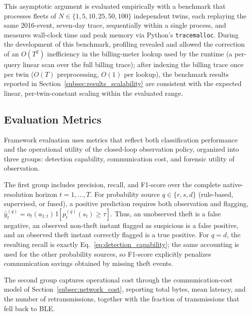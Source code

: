 \documentclass{ieeeaccess}
\begin{document}
This asymptotic argument is evaluated empirically with a benchmark that processes fleets of $N \in \{1, 5, 10, 25, 50, 100\}$ independent twins, each replaying the same 2016-event, seven-day trace, sequentially within a single process, and measures wall-clock time and peak memory via Python's \texttt{tracemalloc}. During the development of this benchmark, profiling revealed and allowed the correction of an $O(T^2)$ inefficiency in the billing-meter lookup used by the runtime (a per-query linear scan over the full billing trace); after indexing the billing trace once per twin ($O(T)$ preprocessing, $O(1)$ per lookup), the benchmark results reported in Section~\ref{subsec:results_scalability} are consistent with the expected linear, per-twin-constant scaling within the evaluated range.

\subsection{Evaluation Metrics}
\label{subsec:metrics}
Framework evaluation uses metrics that reflect both classification performance and the operational utility of the closed-loop observation policy, organized into three groups: detection capability, communication cost, and forensic utility of observation.

The first group includes precision, recall, and F1-score over the complete native-resolution horizon $t=1,\ldots, T$. For probability source $q\in\{r,s,d\}$ (rule-based, supervised, or fused), a positive prediction requires both observation and flagging, $\hat{y}_t^{(q)} = o_t(a_{1:t})\,\mathbb{I}\!\left[p_t^{(q)}(s_t)\ge \tau\right]$. Thus, an unobserved theft is a false negative, an observed non-theft instant flagged as suspicious is a false positive, and an observed theft instant correctly flagged is a true positive. For $q=d$, the resulting recall is exactly Eq.~\eqref{eq:detection_capability}; the same accounting is used for the other probability sources, so F1-score explicitly penalizes communication savings obtained by missing theft events.

The second group captures operational cost through the communication-cost model of Section~\ref{subsec:network_cost}, reporting total bytes, mean latency, and the number of retransmissions, together with the fraction of transmissions that fell back to BLE. 
\end{document}
